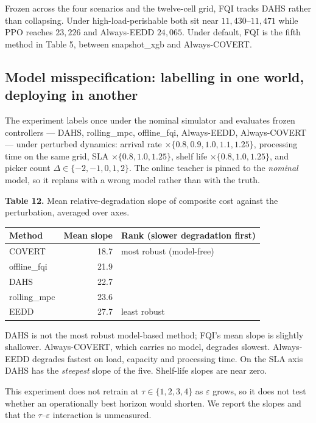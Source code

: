 \documentclass[review,3p,times]{elsarticle}
\newcounter{none}
\theoremstyle{definition}
\begin{document}
Frozen across the four scenarios and the twelve-cell grid, FQI tracks
DAHS rather than collapsing. Under high-load-perishable both sit near
\(11{,}430\)--\(11{,}471\) while PPO reaches \(23{,}226\) and
Always-EEDD \(24{,}065\). Under default, FQI is the fifth method in
Table 5, between snapshot\_xgb and Always-COVERT.

\subsection{Model misspecification: labelling in one world, deploying in
another}\label{model-misspecification-labelling-in-one-world-deploying-in-another}

The experiment labels once under the nominal simulator and evaluates
frozen controllers --- DAHS, rolling\_mpc, offline\_fqi, Always-EEDD,
Always-COVERT --- under perturbed dynamics: arrival rate
\(\times\{0.8,0.9,1.0,1.1,1.25\}\), processing time on the same grid,
SLA \(\times\{0.8,1.0,1.25\}\), shelf life \(\times\{0.8,1.0,1.25\}\),
and picker count \(\Delta \in \{-2,-1,0,1,2\}\). The online teacher is
pinned to the \emph{nominal} model, so it replans with a wrong model
rather than with the truth.

\textbf{Table 12.} Mean relative-degradation slope of composite cost
against the perturbation, averaged over axes.

{\def\LTcaptype{none} %
\begin{longtable}[]{@{}lrl@{}}
\toprule\noalign{}
Method & Mean slope & Rank (slower degradation first) \\
\midrule\noalign{}
\endhead
\bottomrule\noalign{}
\endlastfoot
COVERT & 18.7 & most robust (model-free) \\
offline\_fqi & 21.9 & \\
DAHS & 22.7 & \\
rolling\_mpc & 23.6 & \\
EEDD & 27.7 & least robust \\
\end{longtable}
}

DAHS is not the most robust model-based method; FQI's mean slope is
slightly shallower. Always-COVERT, which carries no model, degrades
slowest. Always-EEDD degrades fastest on load, capacity and processing
time. On the SLA axis DAHS has the \emph{steepest} slope of the five.
Shelf-life slopes are near zero.

This experiment does not retrain at \(\tau \in \{1,2,3,4\}\) as
\(\varepsilon\) grows, so it does not test whether an operationally best
horizon would shorten. We report the slopes and that the
\(\tau\)--\(\varepsilon\) interaction is unmeasured.
\end{document}
